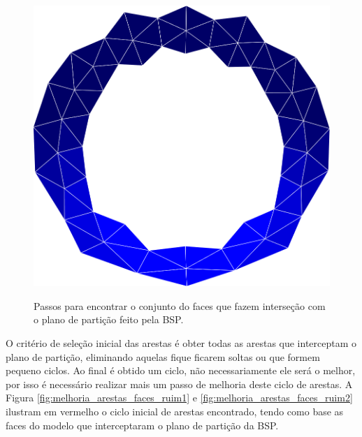 \begin{figure}[!ht]
{   		\begin{minipage}[c]{0.4\textwidth}{\includegraphics[width=\textwidth]{fig/esfera_simples_anel_faces.png}}\end{minipage}
   	}    
   	\caption{Passos para encontrar o conjunto do faces que fazem interseção com o plano de partição feito pela BSP.}
   	\label{fig:espera_faces}
\end{figure}


O critério de seleção inicial das arestas é obter todas as arestas que interceptam o plano de partição, eliminando aquelas fique ficarem soltas ou que formem pequeno ciclos. Ao final é obtido um ciclo, não necessariamente ele será o melhor, por isso é necessário realizar mais um passo de melhoria deste ciclo de arestas. A Figura \ref{fig:melhoria_arestas_faces_ruim1} e \ref{fig:melhoria_arestas_faces_ruim2} ilustram em vermelho o ciclo inicial de arestas encontrado, tendo como base as faces do modelo que interceptaram o plano de partição da BSP.

